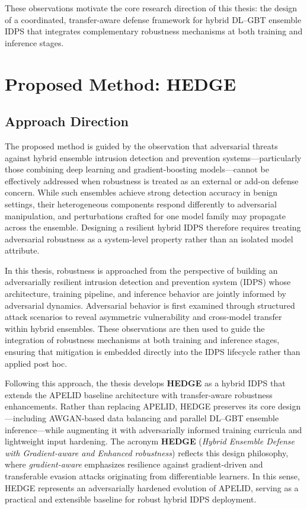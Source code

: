 \documentclass[12pt, a4paper, reqno, oneside]{book}
\begin{document}
These observations motivate the core research direction of this thesis: the design of a coordinated, transfer-aware defense framework for hybrid DL--GBT ensemble IDPS that integrates complementary robustness mechanisms at both training and inference stages.


\chapter{Proposed Method: HEDGE}
\label{chap:method}

\section{Approach Direction}
\label{sec:approach}

The proposed method is guided by the observation that adversarial threats against hybrid ensemble intrusion detection and prevention systems---particularly those combining deep learning and gradient-boosting models---cannot be effectively addressed when robustness is treated as an external or add-on defense concern. While such ensembles achieve strong detection accuracy in benign settings, their heterogeneous components respond differently to adversarial manipulation, and perturbations crafted for one model family may propagate across the ensemble. Designing a resilient hybrid IDPS therefore requires treating adversarial robustness as a system-level property rather than an isolated model attribute.

In this thesis, robustness is approached from the perspective of building an adversarially resilient intrusion detection and prevention system (IDPS) whose architecture, training pipeline, and inference behavior are jointly informed by adversarial dynamics. Adversarial behavior is first examined through structured attack scenarios to reveal asymmetric vulnerability and cross-model transfer within hybrid ensembles. These observations are then used to guide the integration of robustness mechanisms at both training and inference stages, ensuring that mitigation is embedded directly into the IDPS lifecycle rather than applied post hoc.

Following this approach, the thesis develops \textbf{HEDGE} as a hybrid IDPS that extends the APELID baseline architecture \cite{jAPELID24} with transfer-aware robustness enhancements. Rather than replacing APELID, HEDGE preserves its core design---including AWGAN-based data balancing and parallel DL--GBT ensemble inference---while augmenting it with adversarially informed training curricula and lightweight input hardening. The acronym \textbf{HEDGE} (\textit{Hybrid Ensemble Defense with Gradient-aware and Enhanced robustness}) reflects this design philosophy, where \textit{gradient-aware} emphasizes resilience against gradient-driven and transferable evasion attacks originating from differentiable learners. In this sense, HEDGE represents an adversarially hardened evolution of APELID, serving as a practical and extensible baseline for robust hybrid IDPS deployment.
\end{document}
